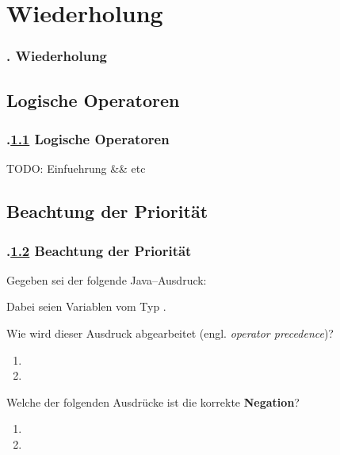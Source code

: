\section{Wiederholung}\label{K:wdh}
\begin{frame}
  \frametitle{\kap. Wiederholung}%
\tableofcontents[current]
\end{frame}


\def\sstitle{Logische Operatoren}
\subsection{\sstitle}\label{S:LogiOperatoren}
\begin{frame}%
  \frametitle{\kap.\ref{S:LogiOperatoren} \sstitle}%

TODO: Einfuehrung \&\& etc

\end{frame}

\def\sstitle{Beachtung der Priorität}
\subsection{\sstitle}\label{S:Prioritat}
\begin{frame}%
  \frametitle{\kap.\ref{S:Prioritat} \sstitle}%

Gegeben sei der folgende Java--Ausdruck:
\begin{center}
\end{center}
Dabei seien  Variablen vom Typ .
\medskip

Wie wird dieser Ausdruck abgearbeitet (engl. \emph{operator precedence})?
\begin{enumerate}
  \item {}
  \item {}
\end{enumerate}

Welche der folgenden Ausdrücke ist die korrekte \textbf{Negation}?
\begin{enumerate}
  \item {}
  \item {}
\end{enumerate}

\end{frame}


